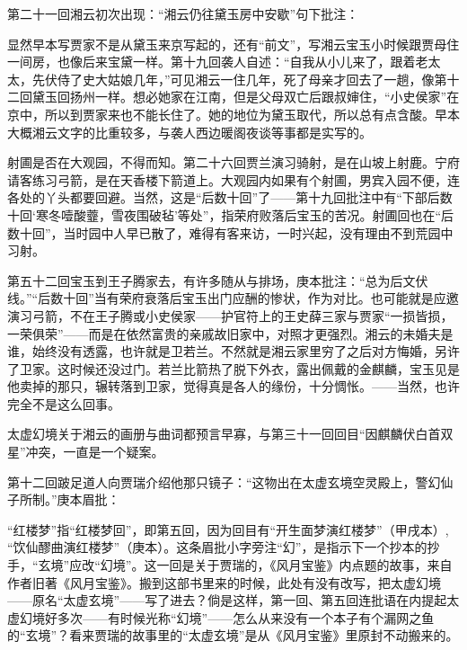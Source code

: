 \par 第二十一回湘云初次出现：“湘云仍往黛玉房中安歇”句下批注：
\par 显然早本写贾家不是从黛玉来京写起的，还有“前文”，写湘云宝玉小时候跟贾母住一间房，也像后来宝黛一样。第十九回袭人自述：“自我从小儿来了，跟着老太太，先伏侍了史大姑娘几年，”可见湘云一住几年，死了母亲才回去了一趟，像第十二回黛玉回扬州一样。想必她家在江南，但是父母双亡后跟叔婶住，“小史侯家”在京中，所以到贾家来也不能长住了。她的地位为黛玉取代，所以总有点含酸。早本大概湘云文字的比重较多，与袭人西边暖阁夜谈等事都是实写的。
\par 射圃是否在大观园，不得而知。第二十六回贾兰演习骑射，是在山坡上射鹿。宁府请客练习弓箭，是在天香楼下箭道上。大观园内如果有个射圃，男宾入园不便，连各处的丫头都要回避。当然，这是“后数十回”了——第十九回批注中有“下部后数十回‘寒冬噎酸虀，雪夜围破毡’等处”，指荣府败落后宝玉的苦况。射圃回也在“后数十回”，当时园中人早已散了，难得有客来访，一时兴起，没有理由不到荒园中习射。
\par 第五十二回宝玉到王子腾家去，有许多随从与排场，庚本批注：“总为后文伏线。”“后数十回”当有荣府衰落后宝玉出门应酬的惨状，作为对比。也可能就是应邀演习弓箭，不在王子腾或小史侯家——护官符上的王史薛三家与贾家“一损皆损，一荣俱荣”——而是在依然富贵的亲戚故旧家中，对照才更强烈。湘云的未婚夫是谁，始终没有透露，也许就是卫若兰。不然就是湘云家里穷了之后对方悔婚，另许了卫家。这时候还没过门。若兰比箭热了脱下外衣，露出佩戴的金麒麟，宝玉见是他卖掉的那只，辗转落到卫家，觉得真是各人的缘份，十分惆怅。——当然，也许完全不是这么回事。
\par 太虚幻境关于湘云的画册与曲词都预言早寡，与第三十一回回目“因麒麟伏白首双星”冲突，一直是一个疑案。
\par 第十二回跛足道人向贾瑞介绍他那只镜子：“这物出在太虚玄境空灵殿上，警幻仙子所制。”庚本眉批：
\par “红楼梦”指“红楼梦回”，即第五回，因为回目有“开生面梦演红楼梦”（甲戌本）, “饮仙醪曲演红楼梦”（庚本）。这条眉批小字旁注“幻”，是指示下一个抄本的抄手，“玄境”应改“幻境”。这一回是关于贾瑞的，《风月宝鉴》内点题的故事，来自作者旧著《风月宝鉴》。搬到这部书里来的时候，此处有没有改写，把太虚幻境——原名“太虚玄境”——写了进去？倘是这样，第一回、第五回连批语在内提起太虚幻境好多次——有时候光称“幻境”——怎么从来没有一个本子有个漏网之鱼的“玄境”？看来贾瑞的故事里的“太虚玄境”是从《风月宝鉴》里原封不动搬来的。
